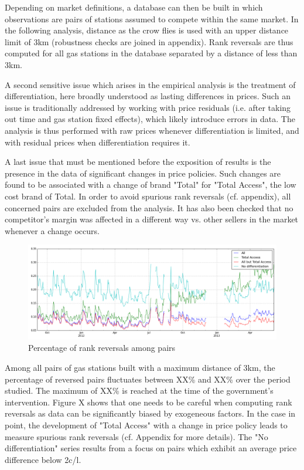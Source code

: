 \documentclass[11pt]{article}
\begin{document}
Depending on market definitions, a database can then be built in which observations are pairs of stations assumed to compete within the same market. In the following analysis, distance as the crow flies is used with an upper distance limit of 3km (robustness checks are joined in appendix). Rank reversals are thus computed for all gas stations in the database separated by a distance of less than 3km.

A second sensitive issue which arises in the empirical analysis is the treatment of differentiation, here broadly understood as lasting differences in prices. Such an issue is traditionally addressed by working with price residuals (i.e. after taking out time and gas station fixed effects), which likely introduce errors in data. The analysis is thus performed with raw prices whenever differentiation is limited, and with residual prices when differentiation requires it.

A last issue that must be mentioned before the exposition of results is the presence in the data of significant changes in price policies. Such changes are found to be associated with a change of brand "Total" for "Total Access", the low cost brand of Total. In order to avoid spurious rank reversals (cf. appendix), all concerned pairs are excluded from the analysis. It has also been checked that no competitor's margin was affected in a different way vs. other sellers in the market whenever a change occurs.

\begin{figure}[!h]
    \caption{Percentage of rank reversals among pairs}
	\centering
		\includegraphics[width=16cm]{graphs/ecdf_rr_temporal.png}
\end{figure}

Among all pairs of gas stations built with a maximum distance of 3km, the percentage of reversed pairs fluctuates between XX\% and XX\% over the period studied. The maximum of XX\% is reached at the time of the government's intervention. Figure X shows that one needs to be careful when computing rank reversals as data can be significantly biased by exogeneous factors. In the case in point, the development of "Total Access" with a change in price policy leads to measure spurious rank reversals (cf. Appendix for more details). The "No differentiation" series results from a focus on pairs which exhibit an average price difference below 2c/l.
\end{document}
